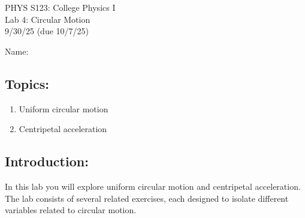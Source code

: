 \documentclass[11pt,letterpaper]{article}
\begin{document}
\setlength{\parindent}{0in}


\begin{flushright}
PHYS S123: College Physics I\\
Lab 4: Circular Motion\\
9/30/25 (due 10/7/25)
\end{flushright}

Name:

\subsection*{Topics:}
\begin{enumerate}
\setlength{\parskip}{3pt}
\item Uniform circular motion
\item Centripetal acceleration
\end{enumerate}

\subsection*{Introduction:}
In this lab you will explore uniform circular motion and centripetal acceleration. The lab consists of several related exercises, each designed to isolate different variables related to circular motion. 



\end{document}
